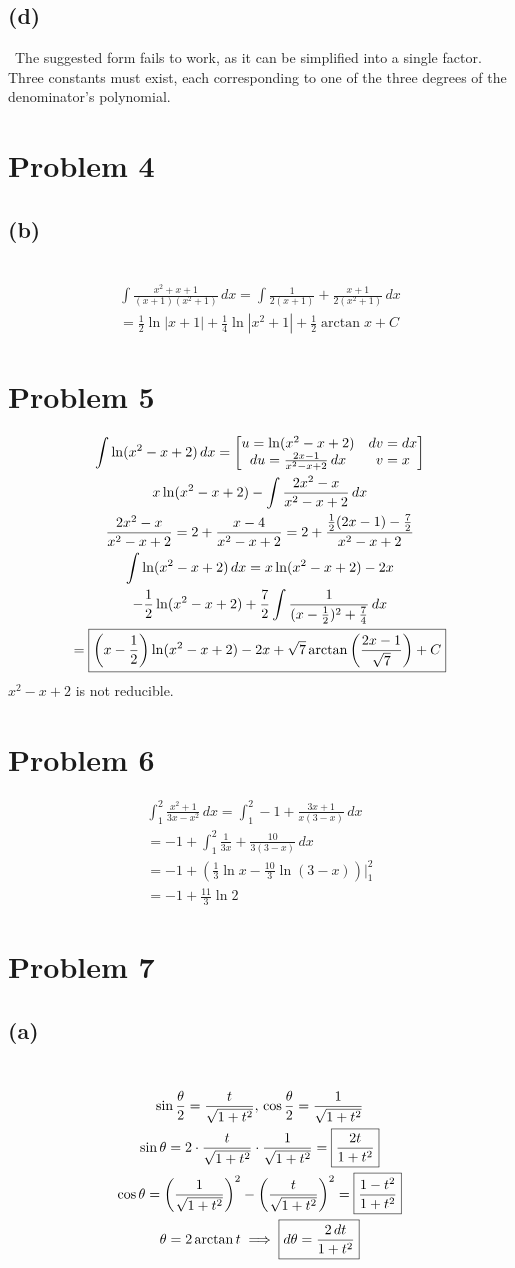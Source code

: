 \documentclass[12pt]{article}
\newcommand*{\paren}[1]{\ensuremath\left(#1\right)}
\newcommand{\problem}[1]{\section{Problem #1}}
\newcommand{\subproblem}[1]{\subsection{(#1)} \,}
\begin{document}
\subproblem{d}
The suggested form fails to work, as it can be simplified into a single factor. Three constants must exist, each corresponding to one of the three degrees of the denominator's polynomial.

\problem{4}

\subproblem{b}
\begin{gather*}
    \int \frac{x^2+x+1}{(x+1)(x^2+1)}  \, dx= \int \frac{1}{2(x+1)} + \frac{x+1}{2(x^2+1)}\, dx\\
    = \boxed{ \frac{1}{2} \ln |x+1| + \frac{1}{4} \ln |x^2+1| + \frac{1}{2}\arctan x+C}
\end{gather*}

\problem{5}
\begin{gather*}
    \int \ln (x^2-x+2)\, dx = \begin{bmatrix}
        u = \ln (x^2-x+2) & dv =dx\\
        du = \frac{2x-1}{x^2-x+2} \, dx& v=x
    \end{bmatrix}\\ 
    x\ln (x^2-x+2) - \int \frac{2x^2-x}{x^2-x+2}\, dx\\
    \frac{2x^2-x}{x^2-x+2}= 2+\frac{x-4}{x^2-x+2} = 2+ \frac{\frac{1}{2}(2x-1) - \frac{7}{2}}{x^2-x+2}\\
    \int \ln (x^2-x+2)\, dx = x\ln (x^2-x+2) - 2x \\- \frac{1}{2} \ln (x^2-x+2) + \frac{7}{2} \int \frac{1}{(x-\frac{1}{2})^2 + \frac{7}{4}} \, dx\\
    = \boxed{\paren{x-\frac{1}{2}} \ln (x^2-x+2) -2x + \sqrt{7 } \arctan \paren{\frac{2x-1}{\sqrt{7}}}+C}
\end{gather*}
$x^2-x+2$ is not reducible.

\problem{6}
\begin{gather*}
    \int_1^2 \frac{x^2+1}{3x-x^2}\, dx = \int_1^2 -1+ \frac{3x+1}{x(3-x)} \, dx\\
    =-1 + \int_1^2 \frac{1}{3x} + \frac{10}{3(3-x)}\, dx\\
    =-1 + (\frac{1}{3} \ln x- \frac{10}{3} \ln (3-x)) \Big|^2_1\\
    = \boxed{-1  + \frac{11}{3} \ln 2}
\end{gather*}

\problem{7}

\subproblem{a}
\begin{gather*}
    \sin \frac{\theta}{2}=\frac{t}{\sqrt{1+t^2}},\, \cos \frac{\theta}{2}= \frac{1}{\sqrt{1+t^2}}\\
    \sin \theta = 2 \cdot \frac{t}{\sqrt{1+t^2}} \cdot \frac{1}{\sqrt{1+t^2}} = \boxed{\frac{2t}{1+t^2}}\\
    \cos \theta = \paren{\frac{1}{\sqrt{1+t^2}}}^2 - \paren{\frac{t}{\sqrt{1+t^2}}}^2 = \boxed{\frac{1-t^2}{1+t^2}}\\
    \theta = 2 \arctan t \implies \boxed{d \theta = \frac{2\, dt}{1+t^2}}
\end{gather*}
\end{document}

